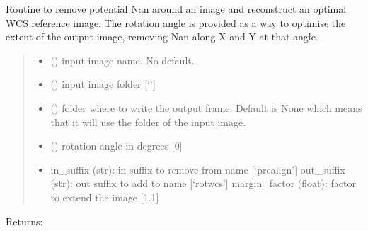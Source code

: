 \documentclass[letterpaper,10pt,english]{sphinxmanual}
\begin{document}
\begin{fulllineitems}
\label{\detokenize{api/pymusepipe:pymusepipe.mpdaf_pipe.rotate_cube_wcs}}
\pysigstartsignatures
{}
\pysigstopsignatures
\sphinxAtStartPar
Routine to remove potential Nan around an image and reconstruct
an optimal WCS reference image. The rotation angle is provided as a way
to optimise the extent of the output image, removing Nan along X and Y
at that angle.
\begin{quote}\begin{description}
\begin{itemize}
\item {} 
\sphinxAtStartPar
{} () \textendash{} input image name. No default.

\item {} 
\sphinxAtStartPar
{} () \textendash{} input image folder {[}‘’{]}

\item {} 
\sphinxAtStartPar
{} () \textendash{} folder where to write the output frame. Default is
None which means that it will use the folder of the input image.

\item {} 
\sphinxAtStartPar
{} () \textendash{} rotation angle in degrees {[}0{]}

\item {} 
\sphinxAtStartPar
{} \textendash{} in\_suffix (str): in suffix to remove from name {[}‘prealign’{]}
out\_suffix (str): out suffix to add to name {[}‘rotwcs’{]}
margin\_factor (float): factor to extend the image {[}1.1{]}

\end{itemize}

\end{description}\end{quote}

\sphinxAtStartPar
Returns:

\end{fulllineitems}
\end{document}
